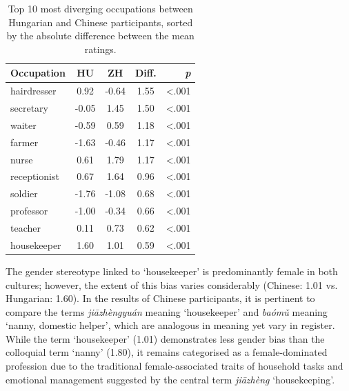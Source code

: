 \documentclass[runningheads]{llncs}
\newcommand{\zh}[1]{\simplifiedchinesefont{#1}\rmfamily}
\begin{document}

\begin{table}
\vspace{-12pt}
\raggedleft
\caption{Top 10 most diverging occupations between Hungarian and Chinese participants, sorted by the absolute difference between the mean ratings.}
\label{tab:top10diff}
\begin{tabular}{lcccr}
\hline
\textbf{Occupation} & \textbf{HU} & \textbf{ZH} & \textbf{Diff.} & \textbf{\textit{p}} \\
\hline
hairdresser      & 0.92 & -0.64 & 1.55 & <.001 \\
secretary        & -0.05 & 1.45 & 1.50 & <.001 \\
waiter           & -0.59 & 0.59 & 1.18 & <.001 \\
farmer           & -1.63 & -0.46 & 1.17 & <.001 \\
nurse            & 0.61 & 1.79 & 1.17 & <.001 \\
receptionist     & 0.67 & 1.64 & 0.96 & <.001 \\
soldier          & -1.76 & -1.08 & 0.68 & <.001 \\
professor        & -1.00 & -0.34 & 0.66 & <.001 \\
teacher          & 0.11 & 0.73 & 0.62 & <.001 \\
housekeeper      & 1.60 & 1.01 & 0.59 & <.001 \\
\hline
\end{tabular}
\end{table}

The gender stereotype linked to `housekeeper' is predominantly female in both cultures; however, the extent of this bias varies considerably (Chinese: 1.01 vs. Hungarian: 1.60). In the results of Chinese participants, it is pertinent to compare the terms \zh{家政员} \textit{jiāzhèngyuán} meaning `housekeeper' and \zh{保姆} \textit{baómǔ} meaning `nanny, domestic helper', which are analogous in meaning yet vary in register. While the term `housekeeper' (1.01) demonstrates less gender bias than the colloquial term `nanny' (1.80), it remains categorised as a female-dominated profession due to the traditional female-associated traits of household tasks and emotional management suggested by the central term \zh{家政} \textit{jiāzhèng} `housekeeping'. 
\end{document}
